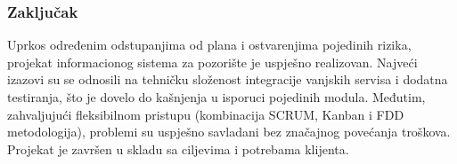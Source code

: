 \newpage

\subsubsection{Zaključak}

Uprkos određenim odstupanjima od plana i ostvarenjima pojedinih rizika, projekat informacionog sistema za pozorište je uspješno realizovan. Najveći izazovi su se odnosili na tehničku složenost integracije vanjskih servisa i dodatna testiranja, što je dovelo do kašnjenja u isporuci pojedinih modula. Međutim, zahvaljujući fleksibilnom pristupu (kombinacija SCRUM, Kanban i FDD metodologija), problemi su uspješno savladani bez značajnog povećanja troškova. Projekat je završen u skladu sa ciljevima i potrebama klijenta.